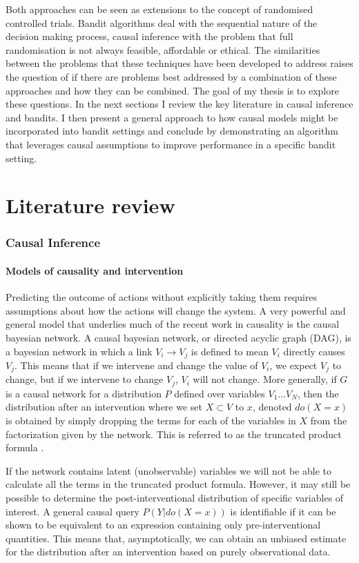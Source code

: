 \documentclass[11pt,a4paper]{article}
\begin{document}
Both approaches can be seen as extensions to the concept of randomised controlled trials. Bandit algorithms deal with the sequential nature of the decision making process, causal inference with the problem that full randomisation is not always feasible, affordable or ethical. The similarities between the problems that these techniques have been developed to address raises the question of if there are problems best addressed by a combination of these approaches and how they can be combined. The goal of my thesis is to explore these questions. In the next sections I review the key literature in causal inference and bandits. I then present a general approach to  how causal models might be incorporated into bandit settings and conclude by demonstrating an algorithm that leverages causal assumptions to improve performance in a specific bandit setting. 

\part{Literature review}
\section{Causal Inference}

\subsection{Models of causality and intervention}

Predicting the outcome of actions without explicitly taking them requires assumptions about how the actions will change the system. A very powerful and general model that underlies much of the recent work in causality is the causal bayesian network. A causal bayesian network, or directed acyclic graph (DAG), is a bayesian network in which a link $V_{i} \rightarrow V_{j}$ is defined to mean $V_{i}$ directly causes $V_{j}$. This means that if we intervene and change the value of $V_{i}$, we expect $V_{j}$ to change, but if we intervene to change $V_{j}$, $V_{i}$ will not change. More generally, if $G$ is a causal network for a distribution $P$ defined over variables $V_{1}...V_{N}$, then the distribution after an intervention where we set $X \subset V$ to $x$, denoted $do(X=x)$ is obtained by simply dropping the terms for each of the variables in $X$ from the factorization given by the network. This is referred to as the truncated product formula \cite{Pearl2000}. 

If the network contains latent (unobservable) variables we will not be able to calculate all the terms in the truncated product formula. However, it may still be possible to determine the post-interventional distribution of specific variables of interest. A general causal query $P(Y|do(X=x))$ is identifiable if it can be shown to be equivalent to an expression containing only pre-interventional quantities. This means that, asymptotically, we can obtain an unbiased estimate for the distribution after an intervention based on purely observational data. 
\end{document}
